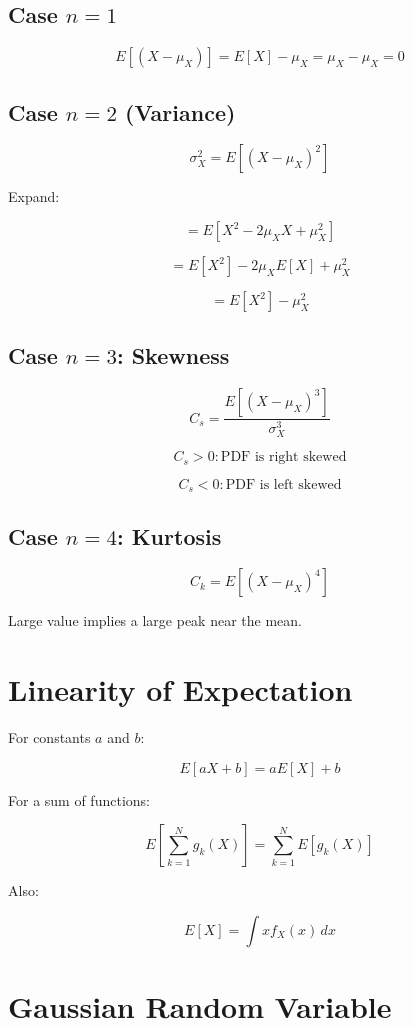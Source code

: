 \documentclass[12pt]{article}
\begin{document}
\subsection*{Case $n=1$}

\[
E[(X-\mu_X)] = E[X] - \mu_X = \mu_X - \mu_X = 0
\]

\subsection*{Case $n=2$ (Variance)}

\[
\sigma_X^2 = E[(X-\mu_X)^2]
\]

Expand:

\[
= E[X^2 - 2\mu_X X + \mu_X^2]
\]

\[
= E[X^2] - 2\mu_X E[X] + \mu_X^2
\]

\[
= E[X^2] - \mu_X^2
\]

\subsection*{Case $n=3$: Skewness}

\[
C_s = \frac{E[(X-\mu_X)^3]}{\sigma_X^3}
\]

\[
C_s > 0 : \text{PDF is right skewed}
\]

\[
C_s < 0 : \text{PDF is left skewed}
\]

\subsection*{Case $n=4$: Kurtosis}

\[
C_k = E[(X-\mu_X)^4]
\]

Large value implies a large peak near the mean.

\section*{Linearity of Expectation}

For constants $a$ and $b$:

\[
E[aX+b] = aE[X] + b
\]

For a sum of functions:

\[
E\left[\sum_{k=1}^N g_k(X)\right] = \sum_{k=1}^N E[g_k(X)]
\]

Also:

\[
E[X] = \int x f_X(x)\, dx
\]

\section*{Gaussian Random Variable}
\end{document}
